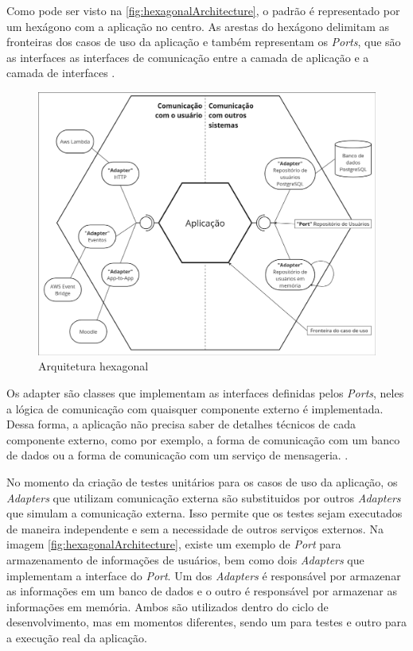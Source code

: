 Como pode ser visto na \autoref{fig:hexagonalArchitecture}, o padrão é representado por um hexágono com a aplicação no centro. As arestas do hexágono delimitam as fronteiras dos casos de uso da aplicação e também representam os \textit{Ports}, que são as interfaces as interfaces de comunicação entre a camada de aplicação e a camada de interfaces \citep{cockburn2017}.

\begin{figure}[H]
\caption{Arquitetura hexagonal}
\label{fig:hexagonalArchitecture}
\includegraphics[width=\textwidth]{capitulos/1-revisao-da-literatura/files/hexagonal.png}
\end{figure}

Os adapter são classes que implementam as interfaces definidas pelos \textit{Ports}, neles a lógica de comunicação com quaisquer componente externo é implementada. Dessa forma, a aplicação não precisa saber de detalhes técnicos de cada componente externo, como por exemplo, a forma de comunicação com um banco de dados ou a forma de comunicação com um serviço de mensageria. \citep{cockburn2017}.

No momento da criação de testes unitários para os casos de uso da aplicação, os \textit{Adapters} que utilizam comunicação externa são substituidos por outros \textit{Adapters} que simulam a comunicação externa. Isso permite que os testes sejam executados de maneira independente e sem a necessidade de outros serviços externos. Na imagem \autoref{fig:hexagonalArchitecture}, existe um exemplo de \textit{Port} para armazenamento de informações de usuários, bem como dois \textit{Adapters} que implementam a interface do \textit{Port}. Um dos \textit{Adapters} é responsável por armazenar as informações em um banco de dados e o outro é responsável por armazenar as informações em memória. Ambos são utilizados dentro do ciclo de desenvolvimento, mas em momentos diferentes, sendo um para testes e outro para a execução real da aplicação.

